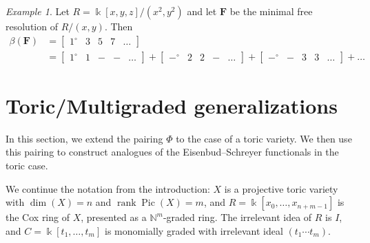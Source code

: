 \documentclass[12pt]{amsart}
\theoremstyle{definition}
\theoremstyle{remark}
\newtheorem{example}[lemma]{Example}
\newcommand{\Pic}{\operatorname{Pic}}
\newcommand{\kk}{\Bbbk}
\newcommand{\rank}{\operatorname{rank}}
\newcommand{\FF}{\mathbf{F}}
\newcommand{\zp}{\circ}
\begin{document}

\begin{example}
Let $R=\kk[x,y,z]/(x^2,y^2)$ and let $\FF$ be the minimal free resolution of $R/(x,y)$.  Then
\begin{align*}
\beta(\FF)&=\begin{bmatrix}1^\zp&3&5&7&\dots \end{bmatrix}\\
&=\begin{bmatrix}1^\zp&1&-&-&\dots \end{bmatrix}+\begin{bmatrix}-^\zp&2&2&-&\dots \end{bmatrix}+\begin{bmatrix}-^\zp&-&3&3&\dots \end{bmatrix}+\dots
\end{align*}
\end{example}




\section{Toric/Multigraded generalizations}\label{sec:toric}
In this section, we extend the pairing $\Phi$ to the case of a toric variety.  We then use this pairing to construct analogues of the Eisenbud--Schreyer functionals in the toric case.

We continue the notation from the introduction: $X$ is a projective toric variety with $\dim(X)=n$ and $\rank \Pic(X)=m$, and $R=\kk[x_0,\dots,x_{n+m-1}]$ is the Cox ring of $X$, presented as a $\mathbb N^m$-graded ring.  The irrelevant idea of $R$ is $I$, and $C= \kk[t_1, \dots, t_m]$ is monomially graded with irrelevant ideal $(t_1\cdots t_m)$.
\end{document}
